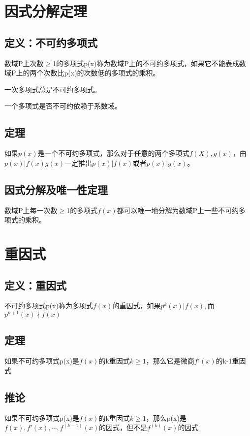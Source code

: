 \documentclass{article}%
\begin{document}
\section{因式分解定理}
\subsection{定义：不可约多项式}
数域P上次数$ \ge $1的多项式p(x)称为数域P上的不可约多项式，如果它不能表成数域P上的两个次数比p(x)的次数低的多项式的乘积。
\\ \hspace*{\fill}

一次多项式总是不可约多项式。
\\ \hspace*{\fill}

一个多项式是否不可约依赖于系数域。
\subsection{定理}
如果$ p(x) $是一个不可约多项式，那么对于任意的两个多项式$ f(X),g(x) $，由$ p(x)|f(x)g(x) $一定推出$ p(x)|f(x) $或者$ p(x)|g(x) $。

\subsection{因式分解及唯一性定理}
数域P上每一次数$ \ge $1的多项式$ f(x) $都可以唯一地分解为数域P上一些不可约多项式的乘积。



\section{重因式}
\subsection{定义：重因式}
不可约多项式p(x)称为多项式$
f(x)$的重因式，如果$ p^k(x)|f(x) ,$而$ p^{k+1}(x)\nmid f(x) $

\subsection{定理}
如果不可约多项式p(x)是$f(x)$的k重因式$ k\ge 1 $，那么它是微商$ f'(x) $的k-1重因式

\subsection{推论}
如果不可约多项式p(x)是$f(x)$的k重因式$ k\ge 1 $，那么p(x)是$ f(x),f'(x),\cdots,f^{(k-1)}(x) $的因式，但不是$ f^{(k)}(x) $的因式
\end{document}
